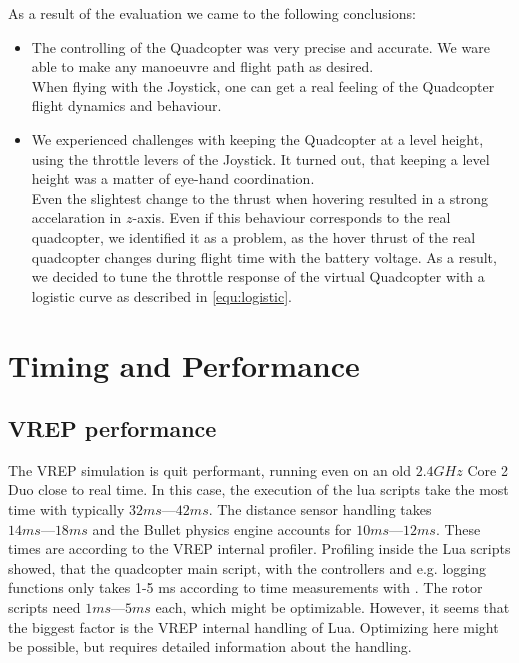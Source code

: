 As a result of the evaluation we came to the following conclusions:

\begin{itemize}
\item{The controlling of the Quadcopter was very precise and accurate. 
We ware able to make any manoeuvre and flight path as desired. \\ 

When flying with the Joystick, one can get a real feeling of the Quadcopter flight dynamics and behaviour}.

\item{We experienced challenges with keeping the Quadcopter at a level height, using the throttle levers of the Joystick. 
It turned out, that keeping a level height was a matter of eye-hand coordination. \\

Even the slightest change to the thrust when hovering resulted in a strong accelaration in $z$-axis. 
Even if this behaviour corresponds to the real quadcopter, we identified it as a problem, as the hover thrust of the real quadcopter changes during flight time with the battery voltage. 
As a result, we decided to tune the throttle response of the virtual Quadcopter with a logistic curve as described in \ref{equ:logistic}}.

\end{itemize}

\section{Timing and Performance}
\subsection{VREP performance}
The VREP simulation is quit performant, running even on an old $2.4 GHz$ Core 2 Duo close to real time.
In this case, the execution of the lua scripts take the most time with typically $32ms — 42ms$.
The distance sensor handling takes $14ms — 18ms$ and the Bullet physics engine accounts for $10ms — 12ms$.
These times are according to the VREP internal profiler.
Profiling inside the Lua scripts showed, that the quadcopter main script, with the controllers and e.g. logging functions only takes 1-5 ms according to time measurements with  .
The rotor scripts need $1ms — 5ms$ each, which might be optimizable.
However, it seems that the biggest factor is the VREP internal handling of Lua.
Optimizing here might be possible, but requires detailed information about the handling.

